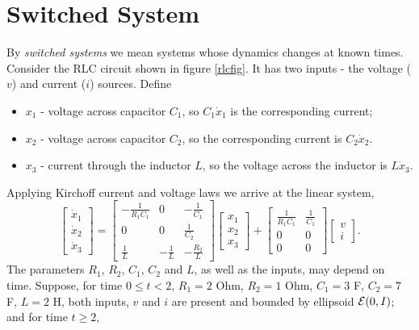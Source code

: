 \section{Switched System}
By {\it switched systems} we mean systems whose dynamics
changes at known times. Consider the RLC circuit shown in figure \ref{rlcfig}.
It has two inputs - the voltage ($v$) and current ($i$) sources.
Define
\begin{itemize}
\item $x_1$ - voltage across capacitor $C_1$, so $C_1\dot{x}_1$ is
the corresponding current;
\item $x_2$ - voltage across capacitor $C_2$, so the corresponding
current is $C_2\dot{x}_2$.
\item $x_3$ - current through the inductor $L$, so the voltage across
the inductor is $L\dot{x}_3$.
\end{itemize}
Applying Kirchoff current and voltage laws we arrive at the linear system,
\begin{equation}
\left[\begin{array}{c}
\dot{x}_1\\
\dot{x}_2\\
\dot{x}_3\end{array}\right] = \left[\begin{array}{ccc}
-\frac{1}{R_1C_1} & 0 & -\frac{1}{C_1}\\
0 & 0 & \frac{1}{C_2}\\
\frac{1}{L} & -\frac{1}{L} & -\frac{R_2}{L}\end{array}\right]
\left[\begin{array}{c}
x_1\\
x_2\\
x_3\end{array}\right] + \left[\begin{array}{cc}
\frac{1}{R_1C_1} & \frac{1}{C_1}\\
0 & 0\\
0 & 0\end{array}\right]\left[\begin{array}{c}
v\\
i\end{array}\right]. \label{rlceq}
\end{equation}
The parameters $R_1$, $R_2$, $C_1$, $C_2$ and $L$, as well as the inputs,
may depend on time. Suppose, for time $0\leq t<2$, $R_1=2$ Ohm, $R_2=1$ Ohm,
$C_1=3$ F, $C_2=7$ F, $L=2$ H, both inputs, $v$ and $i$ are present and
bounded by ellipsoid $\EE(0,I)$; and for time $t\geq 2$,
